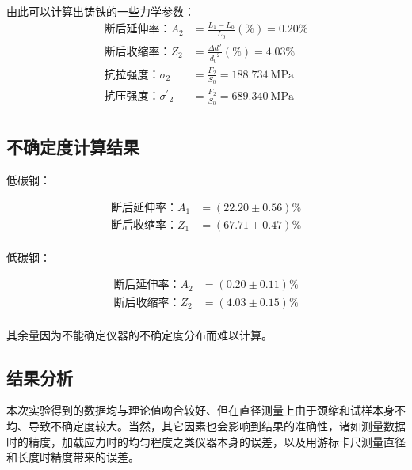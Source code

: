 \documentclass[a4paper,utf8]{article}
\begin{document}
        由此可以计算出铸铁的一些力学参数：
        \newpage
        \begin{align*}
            \text{断后延伸率：} A_2 & = \frac{L_1-L_0}{L_0} (\%) = 0.20 \% \\
            \text{断后收缩率：} Z_2 & = \frac{\Delta d^2}{{d_0}^2} (\%) = 4.03 \% \\
            \text{抗拉强度：} \sigma_2 & = \frac{F_2}{S_0} = \SI{188.734}{\MPa} \\
            \text{抗压强度：} {\sigma^{'}}_2 & = \frac{F_2}{S_0} = \SI{689.340}{\MPa}\\
        \end{align*}

    \subsection{不确定度计算结果}
    低碳钢：\par
    \begin{align*}
        \text{断后延伸率：} A_1 & = (22.20 \pm 0.56) \% \\
        \text{断后收缩率：} Z_1 & = (67.71 \pm 0.47) \% \\
    \end{align*}\par
    低碳钢：\par
    \begin{align*}
        \text{断后延伸率：} A_2 & = (0.20 \pm 0.11) \% \\
        \text{断后收缩率：} Z_2 & = (4.03 \pm 0.15) \% \\
    \end{align*}\par
    其余量因为不能确定仪器的不确定度分布而难以计算。
    \subsection{结果分析}
    本次实验得到的数据均与理论值吻合较好、但在直径测量上由于颈缩和试样本身不均、导致不确定度较大。当然，其它因素也会影响到结果的准确性，诸如测量数据时的精度，加载应力时的均匀程度之类仪器本身的误差，以及用游标卡尺测量直径和长度时精度带来的误差。


\end{document}

